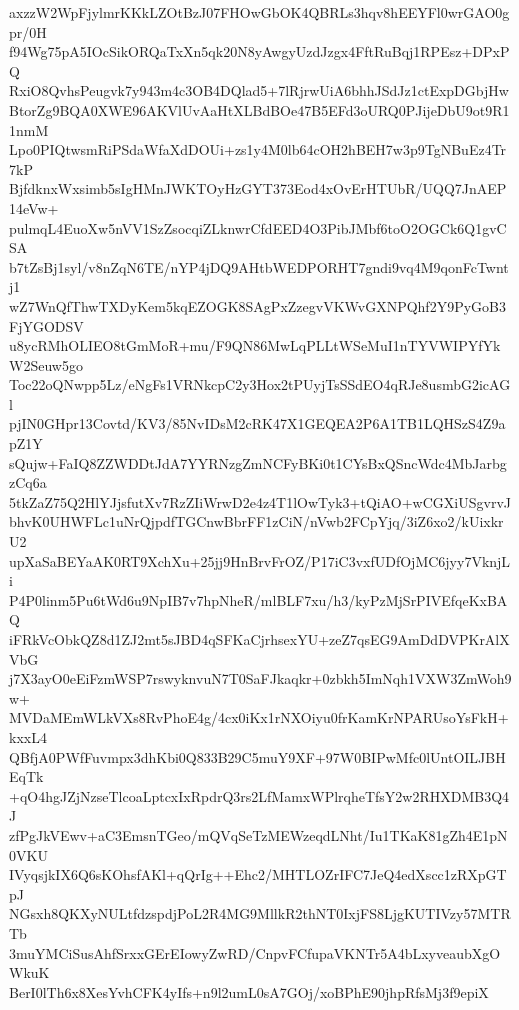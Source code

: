 axzzW2WpFjylmrKKkLZOtBzJ07FHOwGbOK4QBRLs3hqv8hEEYFl0wrGAO0gpr/0H
f94Wg75pA5IOcSikORQaTxXn5qk20N8yAwgyUzdJzgx4FftRuBqj1RPEsz+DPxPQ
RxiO8QvhsPeugvk7y943m4c3OB4DQlad5+7lRjrwUiA6bhhJSdJz1ctExpDGbjHw
BtorZg9BQA0XWE96AKVlUvAaHtXLBdBOe47B5EFd3oURQ0PJijeDbU9ot9R11nmM
Lpo0PIQtwsmRiPSdaWfaXdDOUi+zs1y4M0lb64cOH2hBEH7w3p9TgNBuEz4Tr7kP
BjfdknxWxsimb5sIgHMnJWKTOyHzGYT373Eod4xOvErHTUbR/UQQ7JnAEP14eVw+
pulmqL4EuoXw5nVV1SzZsocqiZLknwrCfdEED4O3PibJMbf6toO2OGCk6Q1gvCSA
b7tZsBj1syl/v8nZqN6TE/nYP4jDQ9AHtbWEDPORHT7gndi9vq4M9qonFcTwntj1
wZ7WnQfThwTXDyKem5kqEZOGK8SAgPxZzegvVKWvGXNPQhf2Y9PyGoB3FjYGODSV
u8ycRMhOLIEO8tGmMoR+mu/F9QN86MwLqPLLtWSeMuI1nTYVWIPYfYkW2Seuw5go
Toc22oQNwpp5Lz/eNgFs1VRNkcpC2y3Hox2tPUyjTsSSdEO4qRJe8usmbG2icAGl
pjIN0GHpr13Covtd/KV3/85NvIDsM2cRK47X1GEQEA2P6A1TB1LQHSzS4Z9apZ1Y
sQujw+FaIQ8ZZWDDtJdA7YYRNzgZmNCFyBKi0t1CYsBxQSncWdc4MbJarbgzCq6a
5tkZaZ75Q2HlYJjsfutXv7RzZIiWrwD2e4z4T1lOwTyk3+tQiAO+wCGXiUSgvrvJ
bhvK0UHWFLc1uNrQjpdfTGCnwBbrFF1zCiN/nVwb2FCpYjq/3iZ6xo2/kUixkrU2
upXaSaBEYaAK0RT9XchXu+25jj9HnBrvFrOZ/P17iC3vxfUDfOjMC6jyy7VknjLi
P4P0linm5Pu6tWd6u9NpIB7v7hpNheR/mlBLF7xu/h3/kyPzMjSrPIVEfqeKxBAQ
iFRkVcObkQZ8d1ZJ2mt5sJBD4qSFKaCjrhsexYU+zeZ7qsEG9AmDdDVPKrAlXVbG
j7X3ayO0eEiFzmWSP7rswyknvuN7T0SaFJkaqkr+0zbkh5ImNqh1VXW3ZmWoh9w+
MVDaMEmWLkVXs8RvPhoE4g/4cx0iKx1rNXOiyu0frKamKrNPARUsoYsFkH+kxxL4
QBfjA0PWfFuvmpx3dhKbi0Q833B29C5muY9XF+97W0BIPwMfc0lUntOILJBHEqTk
+qO4hgJZjNzseTlcoaLptcxIxRpdrQ3rs2LfMamxWPlrqheTfsY2w2RHXDMB3Q4J
zfPgJkVEwv+aC3EmsnTGeo/mQVqSeTzMEWzeqdLNht/Iu1TKaK81gZh4E1pN0VKU
IVyqsjkIX6Q6sKOhsfAKl+qQrIg++Ehc2/MHTLOZrIFC7JeQ4edXscc1zRXpGTpJ
NGsxh8QKXyNULtfdzspdjPoL2R4MG9MllkR2thNT0IxjFS8LjgKUTIVzy57MTRTb
3muYMCiSusAhfSrxxGErEIowyZwRD/CnpvFCfupaVKNTr5A4bLxyveaubXgOWkuK
BerI0lTh6x8XesYvhCFK4yIfs+n9l2umL0sA7GOj/xoBPhE90jhpRfsMj3f9epiX
